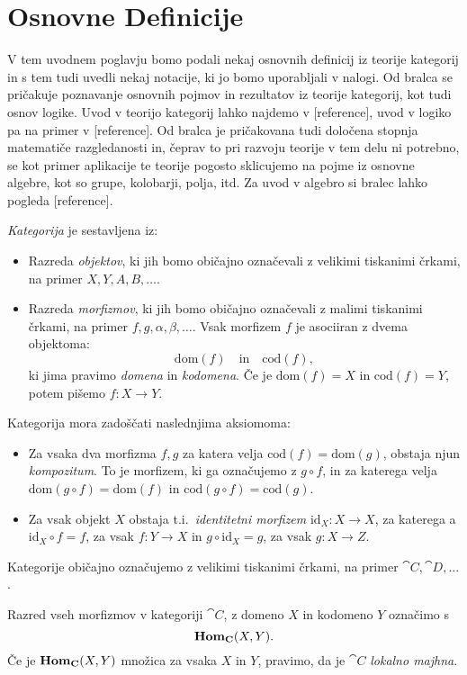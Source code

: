 \documentclass[../kategoricna_logika.tex]{subfiles}
\begin{document}
\section{Osnovne Definicije}
%
V tem uvodnem poglavju bomo podali nekaj osnovnih definicij iz
teorije kategorij in s tem tudi uvedli nekaj notacije,
ki jo bomo uporabljali v nalogi.
Od bralca se pričakuje poznavanje osnovnih pojmov in rezultatov iz
teorije kategorij, kot tudi osnov logike.
Uvod v teorijo kategorij lahko najdemo v [reference],
uvod v logiko pa na primer v [reference].
Od bralca je pričakovana tudi določena stopnja matematiče razgledanosti
in, čeprav to pri razvoju teorije v tem delu ni potrebno, se kot
primer aplikacije te teorije pogosto sklicujemo na pojme iz
osnovne algebre, kot so grupe, kolobarji, polja, itd.
Za uvod v algebro si bralec lahko pogleda [reference].
\begin{definicija}
  \emph{Kategorija} je sestavljena iz:
  \begin{itemize}
  \item Razreda \emph{objektov}, ki jih bomo običajno označevali z
    velikimi tiskanimi črkami, na primer $X, Y, A, B, \ldots$.
  \item Razreda \emph{morfizmov}, ki jih bomo običajno označevali z
    malimi tiskanimi črkami, na primer $f,g,\alpha,\beta, \ldots$.
    Vsak morfizem $f$ je asociiran z dvema objektoma:
    \[ \mathrm{dom}(f) \quad \text{in} \quad \mathrm{cod}(f), \]
    ki jima pravimo \emph{domena} in \emph{kodomena}. Če je $\mathrm{dom}(f)=X$
    in ${\mathrm{cod}(f)=Y}$, potem pišemo $f : X \to Y$.
  \end{itemize}
  Kategorija mora zadoščati naslednjima aksiomoma:
  \begin{itemize}
  \item   Za vsaka dva morfizma $f,g$ za katera velja $\mathrm{cod}(f) = \mathrm{dom}(g)$,
  obstaja njun \emph{kompozitum}. To je morfizem, ki ga označujemo z $g \circ f$, in
  za katerega velja $\mathrm{dom}(g \circ f) = \mathrm{dom}(f)$ in
  $\mathrm{cod}(g \circ f) = \mathrm{cod}(g)$.
  \item Za vsak objekt $X$ obstaja t.i.\ \emph{identitetni morfizem}
  $\mathrm{id}_X : X \to X$, za katerega a $\mathrm{id}_X \circ f = f$,
  za vsak $f : Y \to X$ in $g \circ \mathrm{id}_X = g$, za vsak $g : X \to Z$.
\end{itemize}
Kategorije običajno označujemo z velikimi tiskanimi črkami, na primer $\cat{C}, \cat{D}, \ldots$.
\end{definicija}
\begin{definicija}
  Razred vseh morfizmov v kategoriji $\cat{C}$, z domeno $X$ in kodomeno $Y$ označimo s
  \[ \mathbf{Hom}_{{\operatorname{\mathbf{C}}}}(X,Y).\]
  Če je $\mathbf{Hom}_{{\operatorname{\mathbf{C}}}}(X,Y)$ množica za vsaka $X$ in $Y$, pravimo, da je $\cat{C}$
  \emph{lokalno majhna}.
\end{definicija}
\end{document}
